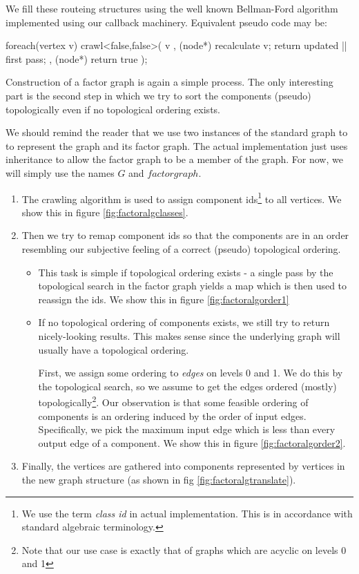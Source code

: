 We fill these routeing structures using the well known Bellman-Ford algorithm \cite{TODO} implemented using our callback machinery. Equivalent pseudo code may be:
\begin{code}
foreach(vertex v)
{
  crawl<false,false>( v
    , (node*){ recalculate v; return updated || first pass;}
    , (node*){ return true }
  ); 
}
\end{code}

Construction of a factor graph is again a simple process. The only interesting part is the second step in which we try to sort the components (pseudo) topologically even if no topological ordering exists.

We should remind the reader that we use two instances of the standard graph to to represent the graph and its factor graph. The actual implementation just uses inheritance to allow the factor graph to be a member of the graph. For now, we will simply use the names $G$ and $factorgraph$.
\begin{enumerate}
  \item The crawling algorithm is used to assign component ids\footnote{We use the term \emph{class id} in actual implementation. This is in accordance with standard algebraic terminology.} to all vertices. We show this in figure \ref{fig:factoralgclasses}.
  \item Then we try to remap component ids so that the components are in an order resembling our subjective feeling of a correct (pseudo) topological ordering. 
    \begin{itemize}
      \item This task is simple if topological ordering exists - a single pass by the topological search in the factor graph yields a map which is then used to reassign the ids. We show this in figure \ref{fig:factoralgorder1}
      \item If no topological ordering of components exists, we still try to return nicely-looking results. This makes sense since the underlying graph will usually have a topological ordering. 
        
        First, we assign some ordering to \emph{edges} on levels 0 and 1. We do this by the topological search, so we assume to get the edges ordered (mostly) topologically\footnote{Note that our use case is exactly that of graphs which are acyclic on levels 0 and 1}. Our observation is that some feasible ordering of components is an ordering induced by the order of input edges. Specifically, we pick the  maximum input edge which is less than every output edge of a component. We show this in figure \ref{fig:factoralgorder2}.
  \end{itemize}
  \item Finally, the vertices are gathered into components represented by vertices in the new graph structure (as shown in fig \ref{fig:factoralgtranslate}).
\end{enumerate}


